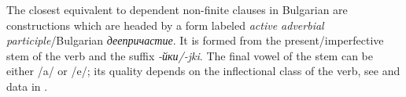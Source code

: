 \documentclass[output=paper,colorlinks=true, citecolor=brown]{langscibook}
\begin{document}
\z

The closest equivalent to dependent non-finite clauses in Bulgarian are constructions which are headed by a form labeled \textit{active adverbial participle}\slash Bulgarian \textit{деепричастие}. It is formed from the present/imperfective stem of the verb and the suffix \textit{-йки\slash -jki}. The final vowel of the stem can be either /a/ or /e/; its quality depends on the inflectional class of the verb, see  \citet[382]{Pǝrvev1983} and data in .


\begin{table}
\caption{Examples of active adverbial participles}
\label{extab:bul:deep-1-otherpossibility}
\end{table}
\end{document}
